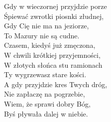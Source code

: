 Gdy w wieczornej przyjdzie porze \\
Śpiewać zwrotki piosnki złudnej, \\
Gdy Cię nie ma na jeziorze, \\
To Mazury nie są cudne. \\

Czasem, kiedyś już zmęczona, \\
W chwili krótkiej przyjemności, \\
W złotych słońca stu ramionach \\
Ty wygrzewasz stare kości. \\

A gdy przyjdzie kres Twych dróg, \\
Nie zapłaczę na pogrzebie, \\
Wiem, że sprawi dobry Bóg, \\
Byś pływała dalej w niebie.